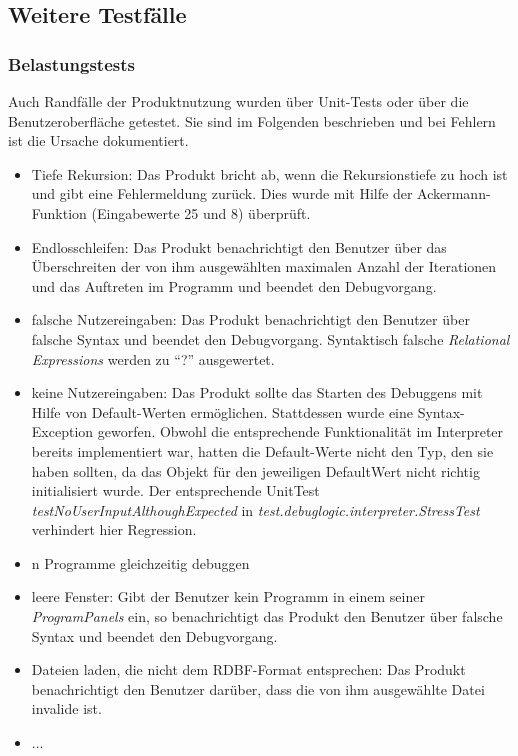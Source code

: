\documentclass[parskip=full]{scrartcl}
\begin{document}
\subsection{Weitere Testfälle}

\subsubsection{Belastungstests} %
\label{stress}
Auch Randfälle der Produktnutzung wurden über Unit-Tests oder über die Benutzeroberfläche getestet. Sie sind im Folgenden beschrieben und bei Fehlern ist die Ursache dokumentiert.
\begin{itemize}
\item Tiefe Rekursion: Das Produkt bricht ab, wenn die Rekursionstiefe zu hoch ist und gibt eine Fehlermeldung zurück. Dies wurde mit Hilfe der Ackermann-Funktion (Eingabewerte 25 und 8) überprüft.
\item Endlosschleifen: Das Produkt benachrichtigt den Benutzer über das Überschreiten der von ihm ausgewählten maximalen Anzahl der Iterationen und das Auftreten im Programm und beendet den Debugvorgang.
\item falsche Nutzereingaben: Das Produkt benachrichtigt den Benutzer über falsche Syntax und beendet den Debugvorgang. Syntaktisch falsche \textit{Relational Expressions} werden zu \enquote{?} ausgewertet.
\item keine Nutzereingaben: Das Produkt sollte das Starten des Debuggens mit Hilfe von Default-Werten ermöglichen. Stattdessen wurde eine Syntax-Exception geworfen. Obwohl die entsprechende Funktionalität im Interpreter bereits implementiert war, hatten die Default-Werte nicht den Typ, den sie haben sollten, da das Objekt für den jeweiligen DefaultWert nicht richtig initialisiert wurde.
Der entsprechende UnitTest \textit{testNoUserInputAlthoughExpected} in \textit{test.debuglogic.interpreter.StressTest} verhindert hier Regression.
\item n Programme gleichzeitig debuggen
\item leere Fenster: Gibt der Benutzer kein Programm in einem seiner \textit{ProgramPanels} ein, so benachrichtigt das Produkt den Benutzer über falsche Syntax und beendet den Debugvorgang.
\item Dateien laden, die nicht dem RDBF-Format entsprechen: Das Produkt benachrichtigt den Benutzer darüber, dass die von ihm ausgewählte Datei invalide ist.
\item ...

\end{itemize}
\end{document}
